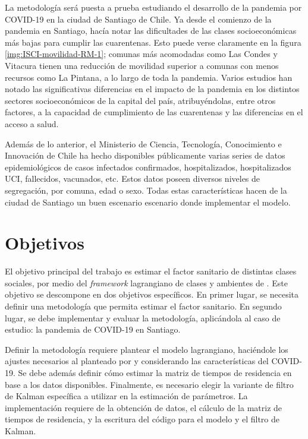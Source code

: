 \begin{intro}
La metodología será puesta a prueba estudiando el desarrollo de la pandemia por COVID-19 en la ciudad de Santiago de Chile. Ya desde el comienzo de la pandemia en Santiago, \cite{Olivares2020} hacía notar las dificultades de las clases socioeconómicas más bajas para cumplir las cuarentenas. Esto puede verse claramente en la figura \ref{img:ISCI-movilidad-RM-1}; comunas más acomodadas como Las Condes y Vitacura tienen una reducción de movilidad superior a comunas con menos recursos como La Pintana, a lo largo de toda la pandemia. Varios estudios \cite{Mena2021}\cite{Bennett2021}\cite{Gozzi2021} han notado las significativas diferencias en el impacto de la pandemia en los distintos sectores socioeconómicos de la capital del país, atribuyéndolas, entre otros factores, a la capacidad de cumplimiento de las cuarentenas y las diferencias en el acceso a salud.

Además de lo anterior, el Ministerio de Ciencia, Tecnología, Conocimiento e Innovación de Chile ha hecho disponibles públicamente \cite{MINCIENCIA} varias series de datos epidemiológicos de casos infectados confirmados, hospitalizados, hospitalizados UCI, fallecidos, vacunados, etc. Estos datos poseen diversos niveles de segregación, por comuna, edad o sexo. Todas estas características hacen de la ciudad de Santiago un buen escenario escenario donde implementar el modelo.




\section*{Objetivos}

El objetivo principal del trabajo es estimar el factor sanitario de distintas clases sociales, por medio del \textit{framework} lagrangiano de clases y ambientes de \cite{Bichara2018}. Este objetivo se descompone en dos objetivos específicos. En primer lugar, se necesita definir una metodología que permita estimar el factor sanitario. En segundo lugar, se debe implementar y evaluar la metodología, aplicándola al caso de estudio: la pandemia de COVID-19 en Santiago. 

Definir la metodología requiere plantear el modelo lagrangiano, haciéndole los ajustes necesarios al planteado por \cite{Bichara2018} y considerando las características del COVID-19. Se debe además definir cómo estimar la matriz de tiempos de residencia en base a los datos disponibles. Finalmente, es necesario elegir la variante de filtro de Kalman específica a utilizar en la estimación de parámetros. La implementación requiere de la obtención de datos, el cálculo de la matriz de tiempos de residencia, y la escritura del código para el modelo y el filtro de Kalman.


\end{intro}
